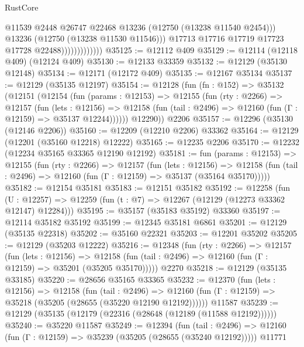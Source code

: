 \begin{lexlean}{RustCore}
\begin{coremodule}
                                  @11539
                                  @2448
                                  @26747
                                  @22468
                                  @13236
                                  (@12750 (@13238 @11540 @2454)))
                                @13236
                                (@12750 (@13238 @11530 @11546)))
                              @17713
                              @17716
                              @17719
                              @17723
                              @17728
                              @22488)))))))))))))
@35125 := @12112 @409
@35129 := @12114 (@12118 @409) (@12124 @409)
@35130 := @12133 @33359
@35132 := @12129 (@35130 @12148)
@35134 := @12171 (@12172 @409)
@35135 := @12167 @35134
@35137 := @12129 (@35135 @12197)
@35154 := @12128
    (fun (fn : @152) =>
    @35132
      (@12151
        (@12154
          (fun (params : @12153) =>
          @12155
            (fun (rty : @2266) =>
            @12157
              (fun (lets : @12156) =>
              @12158 (fun (tail : @2496) => @12160 (fun (Γ : @12159) => @35137 @12244))))))
        @12290))
    @2206
@35157 := @12296 (@35130 (@12146 @2206))
@35160 := @12209 (@12210 @2206) @33362
@35164 := @12129 (@12201 (@35160 @12218) @12222)
@35165 := @12235 @2206
@35170 := @12232 (@12234 @35165 @33365 @12190 @12192)
@35181 := fun (params : @12153) =>
  @12155
    (fun (rty : @2266) =>
    @12157
      (fun (lets : @12156) =>
      @12158 (fun (tail : @2496) => @12160 (fun (Γ : @12159) => @35137 (@35164 @35170)))))
@35182 := @12154 @35181
@35183 := @12151 @35182
@35192 := @12258
    (fun (U : @12257) => @12259 (fun (t : @7) => @12267 (@12129 (@12273 @33362 @12147) @12284)))
@35195 := @35157 (@35183 @35192) @33360
@35197 := @12114 @35182 @35192
@35199 := @12345 @35181 @6861
@35201 := @12129 (@35135 @22318)
@35202 := @35160 @22321
@35203 := @12201 @35202
@35205 := @12129 (@35203 @12222)
@35216 := @12348
    (fun (rty : @2266) =>
    @12157
      (fun (lets : @12156) =>
      @12158 (fun (tail : @2496) => @12160 (fun (Γ : @12159) => @35201 (@35205 @35170)))))
    @2270
@35218 := @12129 (@35135 @33185)
@35220 := @28656 @35165 @33365
@35232 := @12370
    (fun (lets : @12156) =>
    @12158
      (fun (tail : @2496) =>
      @12160 (fun (Γ : @12159) => @35218 (@35205 (@28655 (@35220 @12190 @12192))))))
    @11587
@35239 := @12129 (@35135 (@12179 (@22316 (@28648 (@12189 (@11588 @12192))))))
@35240 := @35220 @11587
@35249 := @12394
    (fun (tail : @2496) => @12160 (fun (Γ : @12159) => @35239 (@35205 (@28655 (@35240 @12192)))))
    @11771

\end{coremodule}
\end{lexlean}
